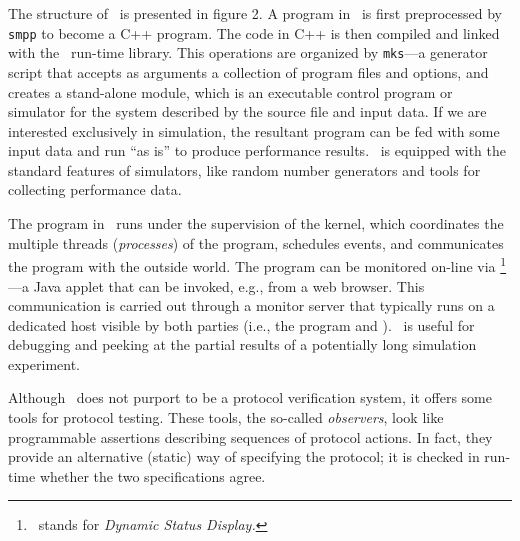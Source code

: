 The structure of \smurph\ is presented in
figure 2.
A program in \smurph\ is first preprocessed by {\tt smpp}
to become a C++ program.
The code in C++ is then compiled and linked with the \smurph\ run-time
library.
This operations are organized by
{\tt mks}---a generator script
that accepts as arguments a collection of program files and options, and
creates a stand-alone module,
which is an executable control program or simulator
for the system described by the source file and input data.
If we are interested exclusively in simulation, the resultant program can
be fed with some input data and run ``as is'' to produce performance results.
\smurph\ is equipped with the standard features of simulators, like
random number generators and tools for collecting performance data.

The program in \smurph\ runs under the supervision of the {\smurph}
kernel, which coordinates the multiple
threads ({\em processes\/}) of the program, schedules events, and
communicates the program with the outside world.
The program can be monitored on-line via \dsd\footnote{\dsd\ stands for
{\em Dynamic Status Display.}}---a Java applet that
can be invoked, e.g., from a web browser.
This communication is carried out through a monitor server that typically
runs on a dedicated host visible by both parties (i.e., the program
and \dsd).
\dsd\ is useful for debugging and peeking at the partial
results of a potentially long simulation experiment.


Although \smurph\ does not purport to be a protocol verification system,
it offers some tools for protocol testing.
These tools, the so-called {\em observers}, look like programmable
assertions describing sequences of protocol actions.
In fact, they provide an alternative (static) way of specifying the protocol;
it is checked in run-time whether the two specifications agree.

